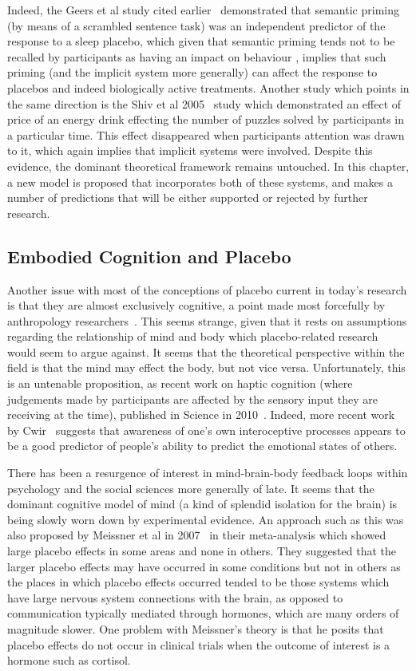 Indeed, the Geers et al study cited earlier~\cite{Geers2005} demonstrated that semantic priming (by means of a scrambled sentence task) was an independent predictor of the response to a sleep placebo, which given that semantic priming tends not to be recalled by participants as having an impact on behaviour \cite{Wittenbrink2007}, implies that such priming (and the implicit system more generally) can affect the response to placebos and indeed biologically active treatments. Another study which points in the same direction is the Shiv et al 2005~\cite{Shiv2005a} study which demonstrated an effect of price of an energy drink effecting the number of puzzles solved by participants in a particular time. This effect disappeared when participants attention was drawn to it, which again implies that implicit systems were involved. Despite this evidence, the dominant theoretical framework remains untouched. In this chapter, a new model is  proposed that incorporates both of these systems, and makes a number of predictions that will be either supported or rejected by further research. 

\subsection{Embodied Cognition and Placebo}
\label{sec:embod-cogn-plac}
Another issue with most of the conceptions of placebo current in today's research is that they are almost exclusively cognitive, a point made most forcefully by anthropology researchers~\cite{Thompson2009}.
This seems strange, given that it rests on assumptions regarding the relationship of mind and body which placebo-related research would seem to argue against. It seems that the theoretical perspective within the field is that the mind may effect the body, but not vice versa. Unfortunately, this is an untenable proposition, as recent work on haptic cognition (where judgements made by participants are affected by the sensory input they are receiving at the time), published in Science in 2010~\cite{ackerman2010incidental}.
Indeed, more recent work by Cwir~\cite{cwir2011your} suggests that awareness of one's own interoceptive processes appears to be a good predictor of people's ability to predict the emotional states of others. 


There has been a resurgence of interest in mind-brain-body feedback loops within psychology and the social sciences more generally of late. It seems that the dominant cognitive model of mind (a kind of splendid isolation for the brain) is being slowly worn down by experimental evidence. An approach such as this was also proposed by Meissner et al in 2007~\cite{Meissner2007} in their meta-analysis which showed large placebo effects in some areas and none in others. They suggested that the larger placebo effects may have occurred in some conditions but not in others as the places in which placebo effects occurred tended to be those systems which have large nervous system connections with the brain, as opposed to communication typically mediated through hormones, which are many orders of magnitude slower. One problem with Meissner's theory is that he posits that placebo effects do not occur in clinical trials when the outcome of interest is a hormone such as cortisol. 


